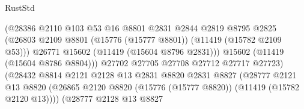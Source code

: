 \begin{lexlean}{RustStd}
\begin{coremodule}
                                            (@28386
                                              @2110
                                              @103
                                              @53
                                              @16
                                              @8801
                                              @2831
                                              @2844
                                              @2819
                                              @8795
                                              @2825
                                              (@26803
                                                @2109
                                                @8801
                                                (@15776 (@15777 @8801))
                                                (@11419 (@15782 @2109 @53)))
                                              @26771
                                              @15602
                                              (@11419 (@15604 @8796 @2831)))
                                            @15602
                                            (@11419 (@15604 @8786 @8804)))
                                          @27702
                                          @27705
                                          @27708
                                          @27712
                                          @27717
                                          @27723)
                                        (@28432
                                          @8814
                                          @2121
                                          @2128
                                          @13
                                          @2831
                                          @8820
                                          @2831
                                          @8827
                                          (@28777
                                            @2121
                                            @13
                                            @8820
                                            (@26865
                                              @2120
                                              @8820
                                              (@15776 (@15777 @8820))
                                              (@11419 (@15782 @2120 @13))))
                                          (@28777
                                            @2128
                                            @13
                                            @8827

\end{coremodule}
\end{lexlean}
